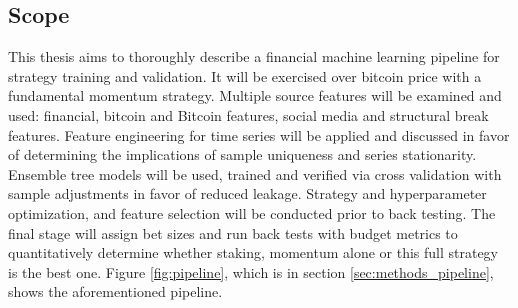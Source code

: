 \subsection{Scope}
\label{sec:intro_scope}

This thesis aims to thoroughly describe a financial machine learning pipeline for strategy training and validation. It will be exercised over bitcoin price with a fundamental momentum strategy. Multiple source features will be examined and used: financial, bitcoin and Bitcoin features, social media and structural break features. Feature engineering for time series will be applied and discussed in favor of determining the implications of sample uniqueness and series stationarity. Ensemble tree models will be used, trained and verified via cross validation with sample adjustments in favor of reduced leakage. Strategy and hyperparameter optimization, and feature selection will be conducted prior to back testing. The final stage will assign bet sizes and run back tests with budget metrics to quantitatively determine whether staking, momentum alone or this full strategy is the best one. Figure \ref{fig:pipeline}, which is in section \ref{sec:methods_pipeline}, shows the aforementioned pipeline.